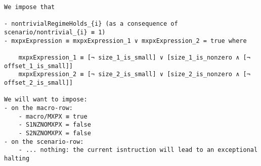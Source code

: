 \documentclass[varwidth=\maxdimen,margin=0.5cm,multi={verbatim}]{standalone}
\begin{document}
\begin{verbatim}
We impose that

- nontrivialRegimeHolds_{i} (as a consequence of scenario/nontrivial_{i} ≡ 1)
- mxpxExpression ≡ mxpxExpression_1 ∨ mxpxExpression_2 = true where

	mxpxExpression_1 ≡ [¬ size_1_is_small] ∨ [size_1_is_nonzero ∧ [¬ offset_1_is_small]]
	mxpxExpression_2 ≡ [¬ size_2_is_small] ∨ [size_2_is_nonzero ∧ [¬ offset_2_is_small]]

We will want to impose:
- on the macro-row:
	- macro/MXPX ≡ true
	- S1NZNOMXPX = false
	- S2NZNOMXPX = false
- on the scenario-row:
	- ... nothing: the current isntruction will lead to an exceptional halting

\end{verbatim}
\end{document}
